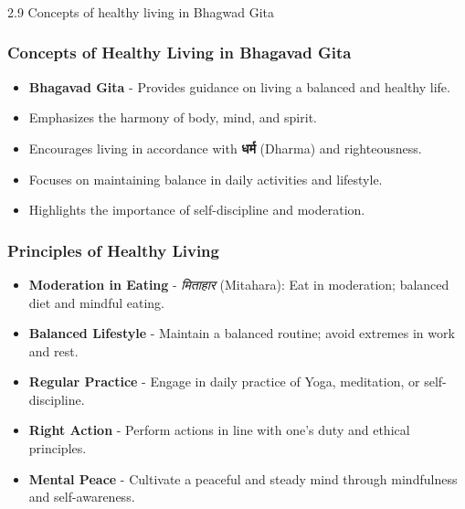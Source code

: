 \begin{frame}[fragile]\frametitle{}
\begin{center}
{\Large 2.9  Concepts of healthy living in Bhagwad Gita}
\end{center}
\end{frame}

\begin{frame}[fragile]\frametitle{Concepts of Healthy Living in Bhagavad Gita}

      \begin{itemize}
		\item \textbf{Bhagavad Gita} - Provides guidance on living a balanced and healthy life.
		\item Emphasizes the harmony of body, mind, and spirit.
		\item Encourages living in accordance with \textbf{धर्म} (Dharma) and righteousness.
		\item Focuses on maintaining balance in daily activities and lifestyle.
		\item Highlights the importance of self-discipline and moderation.
	  \end{itemize}

\end{frame}

\begin{frame}[fragile]\frametitle{Principles of Healthy Living}

      \begin{itemize}
		\item \textbf{Moderation in Eating} - \textit{मिताहार} (Mitahara): Eat in moderation; balanced diet and mindful eating.
		\item \textbf{Balanced Lifestyle} - Maintain a balanced routine; avoid extremes in work and rest.
		\item \textbf{Regular Practice} - Engage in daily practice of Yoga, meditation, or self-discipline.
		\item \textbf{Right Action} - Perform actions in line with one’s duty and ethical principles.
		\item \textbf{Mental Peace} - Cultivate a peaceful and steady mind through mindfulness and self-awareness.
	  \end{itemize}

\end{frame}

